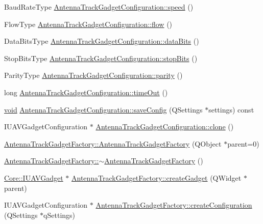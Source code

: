 \begin{DoxyCompactItemize}
\item 
\-Baud\-Rate\-Type \hyperlink{group___antenna_track_gadget_plugin_ga9f04acbb3e66e621c35afaa756e61cb0}{\-Antenna\-Track\-Gadget\-Configuration\-::speed} ()
\item 
\-Flow\-Type \hyperlink{group___antenna_track_gadget_plugin_ga6c02451beb6f94db4d3c67bd13fa9c3e}{\-Antenna\-Track\-Gadget\-Configuration\-::flow} ()
\item 
\-Data\-Bits\-Type \hyperlink{group___antenna_track_gadget_plugin_gac5cb692c8bb0b91960b4697df1d68401}{\-Antenna\-Track\-Gadget\-Configuration\-::data\-Bits} ()
\item 
\-Stop\-Bits\-Type \hyperlink{group___antenna_track_gadget_plugin_ga9cb31ed1936c27264a65a79f45ca67b9}{\-Antenna\-Track\-Gadget\-Configuration\-::stop\-Bits} ()
\item 
\-Parity\-Type \hyperlink{group___antenna_track_gadget_plugin_ga24493de658f97012f89d15d6058bc1f7}{\-Antenna\-Track\-Gadget\-Configuration\-::parity} ()
\item 
long \hyperlink{group___antenna_track_gadget_plugin_gaeecdda26c0e04883d4ddb31cca80a3ca}{\-Antenna\-Track\-Gadget\-Configuration\-::time\-Out} ()
\item 
\hyperlink{group___u_a_v_objects_plugin_ga444cf2ff3f0ecbe028adce838d373f5c}{void} \hyperlink{group___antenna_track_gadget_plugin_ga5666ade504f914b0118bb6cc51919d95}{\-Antenna\-Track\-Gadget\-Configuration\-::save\-Config} (\-Q\-Settings $\ast$settings) const 
\item 
\-I\-U\-A\-V\-Gadget\-Configuration $\ast$ \hyperlink{group___antenna_track_gadget_plugin_ga75fc3a4d561ce3996236b59c1cde51f3}{\-Antenna\-Track\-Gadget\-Configuration\-::clone} ()
\item 
\hyperlink{group___antenna_track_gadget_plugin_ga1ef8f35faf1ffe91c15080461b78649c}{\-Antenna\-Track\-Gadget\-Factory\-::\-Antenna\-Track\-Gadget\-Factory} (\-Q\-Object $\ast$parent=0)
\item 
\hyperlink{group___antenna_track_gadget_plugin_ga6d885117d7af90d116622d81273651cd}{\-Antenna\-Track\-Gadget\-Factory\-::$\sim$\-Antenna\-Track\-Gadget\-Factory} ()
\item 
\hyperlink{class_core_1_1_i_u_a_v_gadget}{\-Core\-::\-I\-U\-A\-V\-Gadget} $\ast$ \hyperlink{group___antenna_track_gadget_plugin_ga50d1ad5798eee9e1ca60c3e1bf0559fc}{\-Antenna\-Track\-Gadget\-Factory\-::create\-Gadget} (\-Q\-Widget $\ast$parent)
\item 
\-I\-U\-A\-V\-Gadget\-Configuration $\ast$ \hyperlink{group___antenna_track_gadget_plugin_gaa4cb4bdba7574a5ba89c52f6791bc6d4}{\-Antenna\-Track\-Gadget\-Factory\-::create\-Configuration} (\-Q\-Settings $\ast$q\-Settings)

\end{DoxyCompactItemize}
